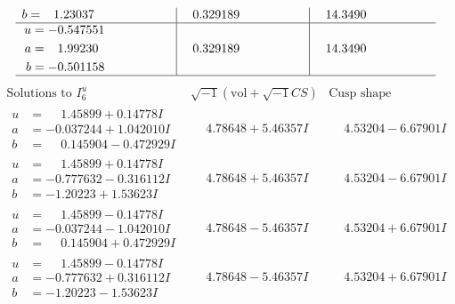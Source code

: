 \documentclass[1p]{elsarticle_modified}
\theoremstyle{definition}
\newcommand{\I}{\sqrt{-1}}
\begin{document}
$$\begin{array}{c|c|c}
\begin{aligned}
b &= \phantom{-}1.23037\phantom{ +0.000000I}\end{aligned}
 & \phantom{-}0.329189\phantom{ +0.000000I} & \phantom{-}14.3490\phantom{ +0.000000I} \\ \hline\begin{aligned}
u &= -0.547551\phantom{ +0.000000I} \\
a &= \phantom{-}1.99230\phantom{ +0.000000I} \\
b &= -0.501158\phantom{ +0.000000I}\end{aligned}
 & \phantom{-}0.329189\phantom{ +0.000000I} & \phantom{-}14.3490\phantom{ +0.000000I}\\
 \hline 
 \end{array}$$\newpage$$\begin{array}{c|c|c}  
\text{Solutions to }I^u_{6}& \I (\text{vol} + \sqrt{-1}CS) & \text{Cusp shape}\\
 \hline 
\begin{aligned}
u &= \phantom{-}1.45899 + 0.14778 I \\
a &= -0.037244 + 1.042010 I \\
b &= \phantom{-}0.145904 - 0.472929 I\end{aligned}
 & \phantom{-}4.78648 + 5.46357 I & \phantom{-}4.53204 - 6.67901 I \\ \hline\begin{aligned}
u &= \phantom{-}1.45899 + 0.14778 I \\
a &= -0.777632 - 0.316112 I \\
b &= -1.20223 + 1.53623 I\end{aligned}
 & \phantom{-}4.78648 + 5.46357 I & \phantom{-}4.53204 - 6.67901 I \\ \hline\begin{aligned}
u &= \phantom{-}1.45899 - 0.14778 I \\
a &= -0.037244 - 1.042010 I \\
b &= \phantom{-}0.145904 + 0.472929 I\end{aligned}
 & \phantom{-}4.78648 - 5.46357 I & \phantom{-}4.53204 + 6.67901 I \\ \hline\begin{aligned}
u &= \phantom{-}1.45899 - 0.14778 I \\
a &= -0.777632 + 0.316112 I \\
b &= -1.20223 - 1.53623 I\end{aligned}
 & \phantom{-}4.78648 - 5.46357 I & \phantom{-}4.53204 + 6.67901 I \\ \hline\begin{aligned}

\end{aligned}
\end{array}$$
\end{document}
